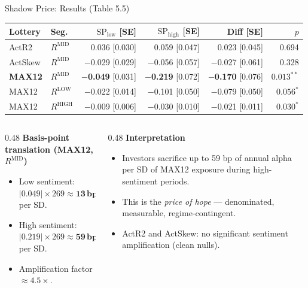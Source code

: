 \documentclass[10pt, aspectratio=169]{beamer}
\newcommand{\bp}{\,\text{bp}}
\begin{document}
\begin{frame}{Shadow Price: Results (Table 5.5)}
  \footnotesize
  \begin{tabular}{llrrrr}
    \toprule
    Lottery & Seg. & $\text{SP}_{\text{low}}$ [SE] & $\text{SP}_{\text{high}}$ [SE] & Diff [SE] & $p$ \\
    \midrule
    ActR2   & $R^{\text{MID}}$ & 0.036 [0.030] & 0.059 [0.047] & 0.023 [0.045] & 0.694 \\
    ActSkew & $R^{\text{MID}}$ & $-$0.029 [0.029] & $-$0.056 [0.057] & $-$0.027 [0.061] & 0.328 \\
    \textbf{MAX12} & $R^{\text{MID}}$ & $-$\textbf{0.049} [0.031] & $-$\textbf{0.219} [0.072] &
    $-$\textbf{0.170} [0.076] & $\mathbf{0.013^{**}}$ \\
    MAX12   & $R^{\text{LOW}}$ & $-$0.022 [0.014] & $-$0.101 [0.050] & $-$0.079 [0.050] & $0.056^{*}$ \\
    MAX12   & $R^{\text{HIGH}}$& $-$0.009 [0.006] & $-$0.030 [0.010] & $-$0.021 [0.011] & $0.030^{*}$ \\
    \bottomrule
  \end{tabular}
  \vspace{8pt}
  \begin{columns}[T]
    \begin{column}{0.48\textwidth}
      \textbf{Basis-point translation (MAX12, $R^{\text{MID}}$)}
      \begin{itemize}\itemsep3pt
        \item Low sentiment: $|0.049| \times 269 \approx \mathbf{13\bp}$ per SD.
        \item High sentiment: $|0.219| \times 269 \approx \mathbf{59\bp}$ per SD.
        \item \alert{Amplification factor $\approx 4.5\times$.}
      \end{itemize}
    \end{column}
    \begin{column}{0.48\textwidth}
      \textbf{Interpretation}
      \begin{itemize}\itemsep3pt
        \item Investors sacrifice up to 59 bp of annual alpha per SD of MAX12 exposure
              during high-sentiment periods.
        \item This is the \emph{price of hope} — denominated, measurable, regime-contingent.
        \item ActR2 and ActSkew: no significant sentiment amplification (clean nulls).
      \end{itemize}
    \end{column}
  \end{columns}
\end{frame}
\end{document}
